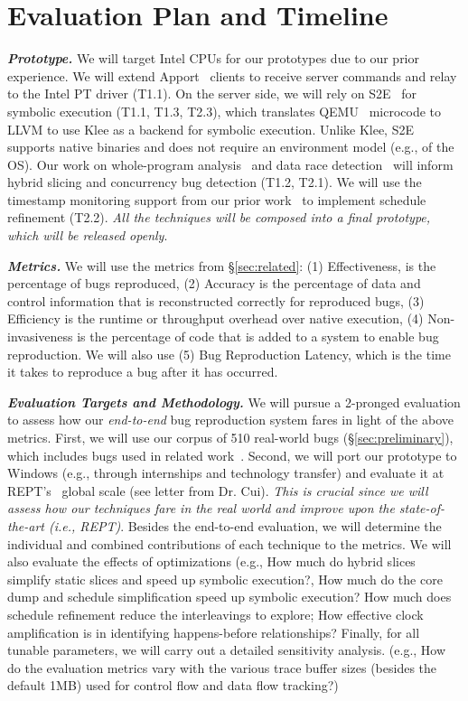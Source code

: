 \section{Evaluation Plan and Timeline}
\label{sec:evaluation}

\noindent \textit{\textbf{Prototype.}} We will target Intel CPUs for our prototypes due to our prior experience. We will extend Apport~\cite{ubuntuApport} clients to receive server commands and relay to the Intel PT driver (T1.1). On the server side, we will rely on S2E~\cite{Chipounov11} for symbolic execution (T1.1, T1.3, T2.3), which translates QEMU~\cite{qemu} microcode to LLVM to use Klee as a backend for symbolic execution. Unlike Klee, S2E supports native binaries and does not require an environment model (e.g., of the OS). Our work on whole-program analysis~\cite{snorlax} and data race detection~\cite{portend} will inform hybrid slicing and concurrency bug detection (T1.2, T2.1). We will use the timestamp monitoring support from our prior work~\cite{snorlax} to implement schedule refinement (T2.2). \textit{All the techniques will be composed into a final prototype, which will be released openly}.

\noindent \textit{\textbf{Metrics.}} We will use the metrics from \S\ref{sec:related}: (1) Effectiveness, is the percentage of bugs reproduced, (2) Accuracy is the percentage of data and control information that is reconstructed correctly for reproduced bugs, (3) Efficiency is the runtime or throughput overhead over native execution, (4) Non-invasiveness is the percentage of code that is added to a system to enable bug reproduction. We will also use (5) Bug Reproduction Latency, which is the time it takes to reproduce a bug after it has occurred.


\noindent \textit{\textbf{Evaluation Targets and Methodology.}} We will pursue a 2-pronged evaluation to assess how our \textit{end-to-end} bug reproduction system fares in light of the above metrics. First, we will use our corpus of 510 real-world bugs (\S\ref{sec:preliminary}), which includes bugs used in related work~\cite{jieyucon28:database,lin:jacontebe,snorlax,gist}. Second, we will port our prototype to Windows (e.g., through internships and technology transfer) and evaluate it at REPT's~\cite{rept} global scale (see letter from Dr. Cui). \textit{This is crucial since we will assess how our techniques fare in the real world and improve upon the state-of-the-art (i.e., REPT)}. Besides the end-to-end evaluation, we will determine the individual and combined contributions of each technique to the metrics. We will also evaluate the effects of optimizations (e.g., How much do hybrid slices simplify static slices and speed up symbolic execution?, How much do the core dump and schedule simplification speed up symbolic execution? How much does schedule refinement reduce the interleavings to explore; How effective clock amplification is in identifying happens-before relationships? Finally, for all tunable parameters, we will carry out a detailed sensitivity analysis. (e.g., How do the evaluation metrics vary with the various trace buffer sizes (besides the default 1MB) used for control flow and data flow tracking?)

